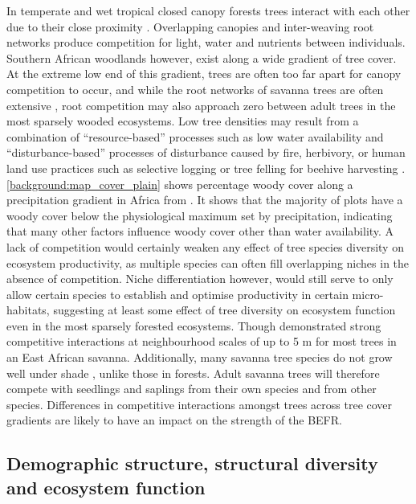\begin{refsection}
In temperate and wet tropical closed canopy forests trees interact with each other due to their close proximity \citep{Coomes2007a, Purves2007}. Overlapping canopies and inter-weaving root networks produce competition for light, water and nutrients between individuals. Southern African woodlands however, exist along a wide gradient of tree cover. At the extreme low end of this gradient, trees are often too far apart for canopy competition to occur, and while the root networks of savanna trees are often extensive \citep{Belsky1994}, root competition may also approach zero between adult trees in the most sparsely wooded ecosystems. Low tree densities may result from a combination of ``resource-based'' processes such as low water availability and ``disturbance-based'' processes of disturbance caused by fire, herbivory, or human land use practices such as selective logging or tree felling for beehive harvesting \citep{Ryan2016}. \autoref{background:map_cover_plain} shows percentage woody cover along a precipitation gradient in Africa from \citet{Sankaran2005}. It shows that the majority of plots have a woody cover below the physiological maximum set by precipitation, indicating that many other factors influence woody cover other than water availability. A lack of competition would certainly weaken any effect of tree species diversity on ecosystem productivity, as multiple species can often fill overlapping niches in the absence of competition. Niche differentiation however, would still serve to only allow certain species to establish and optimise productivity in certain micro-habitats, suggesting at least some effect of tree diversity on ecosystem function even in the most sparsely forested ecosystems. Though \citet{Dohn2017} demonstrated strong competitive interactions at neighbourhood scales of up to 5 m for most trees in an East African savanna. Additionally, many savanna tree species do not grow well under shade \citep{Belsky1994}, unlike those in forests. Adult savanna trees will therefore compete with seedlings and saplings from their own species and from other species. Differences in competitive interactions amongst trees across tree cover gradients are likely to have an impact on the strength of the BEFR. 

\subsection{Demographic structure, structural diversity and ecosystem function}
\label{background:ssec:demography}


\end{refsection}
